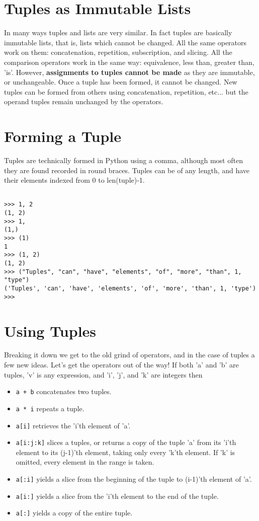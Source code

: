 \section{Tuples as Immutable Lists}

In many ways tuples and lists are very similar. In fact tuples are   basically immutable lists, that is, lists which cannot be changed. All   the same operators work on them: concatenation, repetition,   subscription, and slicing. All the comparison operators work in the   same way: equivalence, less than, greater than, 'is'. However,   \textbf{assignments to tuples cannot be made} as they are   immutable, or unchangeable.  Once a tuple has been formed, it cannot be   changed. New tuples can be formed from others using concatenation,   repetition, etc... but the operand tuples remain unchanged by the   operators.

\section{Forming a Tuple}

Tuples are technically formed in Python using a comma, although most   often they are found recorded in round braces. Tuples can be of any   length, and have their elements indexed from 0 to len(tuple)-1.
\begin{lstlisting}

>>> 1, 2
(1, 2)
>>> 1, 
(1,)
>>> (1)
1
>>> (1, 2)
(1, 2)
>>> ("Tuples", "can", "have", "elements", "of", "more", "than", 1, "type")
('Tuples', 'can', 'have', 'elements', 'of', 'more', 'than', 1, 'type')
>>>
\end{lstlisting}

\section{Using Tuples}

Breaking it down we get to the old grind of operators, and in the   case of tuples a few new ideas. Let's get the operators out of the   way! If both 'a' and 'b' are tuples, 'v' is any expression, and 'i',   'j', and 'k' are integers then
\begin{itemize}
	\item 
\texttt{a + b} concatenates two tuples.
	\item 
\texttt{a * i} repeats a tuple.
	\item 
\texttt{a[i]} retrieves the 'i'th element of    'a'.
	\item 
\texttt{a[i:j:k]} slices a tuples, or returns a copy of the tuple 'a'    from its 'i'th element to its (j-1)'th element, taking only every    'k'th element. If 'k' is omitted, every element in the range is    taken.
	\item 
\texttt{a[:i]} yields a slice from the beginning of the    tuple to (i-1)'th element of 'a'.
	\item 
\texttt{a[i:]} yields a slice from the 'i'th element to the    end of the tuple.
	\item 
\texttt{a[:]} yields a copy of the entire tuple.
\end{itemize}

